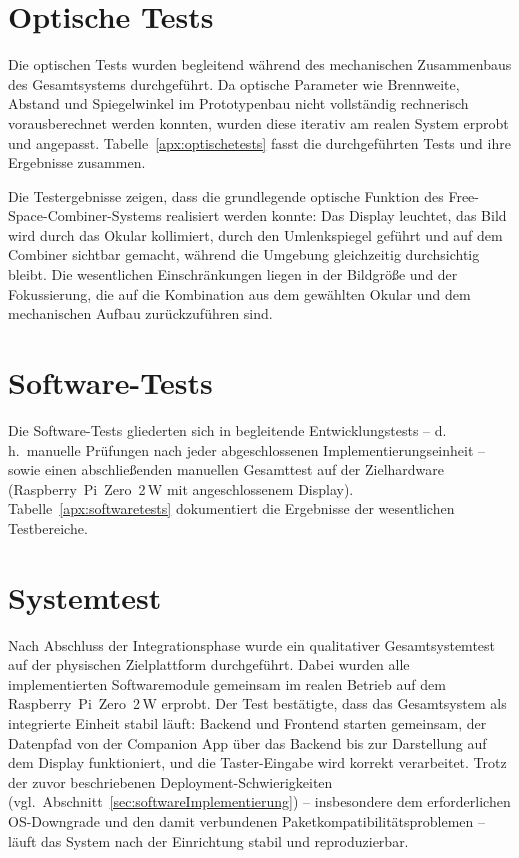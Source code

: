 \section{Optische Tests}
\label{sec:optischeTests}

Die optischen Tests wurden begleitend während des mechanischen Zusammenbaus des
Gesamtsystems durchgeführt.
Da optische Parameter wie Brennweite, Abstand und Spiegelwinkel im Prototypenbau
nicht vollständig rechnerisch vorausberechnet werden konnten, wurden diese iterativ
am realen System erprobt und angepasst.
Tabelle~\ref{apx:optischetests} fasst die durchgeführten Tests und ihre Ergebnisse
zusammen.

Die Testergebnisse zeigen, dass die grundlegende optische Funktion des
Free-Space-Combiner-Systems realisiert werden konnte: Das Display leuchtet,
das Bild wird durch das Okular kollimiert, durch den Umlenkspiegel geführt
und auf dem Combiner sichtbar gemacht, während die Umgebung gleichzeitig
durchsichtig bleibt.
Die wesentlichen Einschränkungen liegen in der Bildgröße und der Fokussierung,
die auf die Kombination aus dem gewählten Okular und dem mechanischen Aufbau
zurückzuführen sind.

\section{Software-Tests}
\label{sec:SoftwareTests}

Die Software-Tests gliederten sich in begleitende Entwicklungstests -- d.\,h.\
manuelle Prüfungen nach jeder abgeschlossenen Implementierungseinheit -- sowie
einen abschließenden manuellen Gesamttest auf der Zielhardware (Raspberry~Pi~Zero~2\,W
mit angeschlossenem Display).
Tabelle~\ref{apx:softwaretests} dokumentiert die Ergebnisse der wesentlichen
Testbereiche.

\section{Systemtest}
\label{sec:SystemTest}

Nach Abschluss der Integrationsphase wurde ein qualitativer Gesamtsystemtest
auf der physischen Zielplattform durchgeführt.
Dabei wurden alle implementierten Softwaremodule gemeinsam im realen Betrieb
auf dem Raspberry~Pi~Zero~2\,W erprobt.
\newpage
Der Test bestätigte, dass das Gesamtsystem als integrierte Einheit stabil läuft:
Backend und Frontend starten gemeinsam, der Datenpfad von der Companion App über
das Backend bis zur Darstellung auf dem Display funktioniert, und die
Taster-Eingabe wird korrekt verarbeitet.
Trotz der zuvor beschriebenen Deployment-Schwierigkeiten
(vgl.~Abschnitt~\ref{sec:softwareImplementierung}) -- insbesondere dem erforderlichen
OS-Downgrade und den damit verbundenen Paketkompatibilitätsproblemen -- läuft das
System nach der Einrichtung stabil und reproduzierbar.


